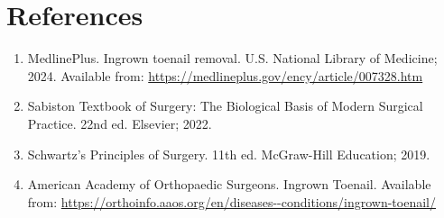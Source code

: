 \section*{References}
\begin{enumerate}
  \item MedlinePlus. Ingrown toenail removal. U.S. National Library of Medicine; 2024. Available from: \url{https://medlineplus.gov/ency/article/007328.htm}
  \item Sabiston Textbook of Surgery: The Biological Basis of Modern Surgical Practice. 22nd ed. Elsevier; 2022.
  \item Schwartz's Principles of Surgery. 11th ed. McGraw-Hill Education; 2019.
  \item American Academy of Orthopaedic Surgeons. Ingrown Toenail. Available from: \url{https://orthoinfo.aaos.org/en/diseases--conditions/ingrown-toenail/}
\end{enumerate}

\clearpage
